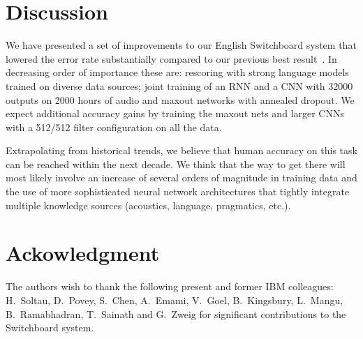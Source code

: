 \documentclass[a4paper]{article}
\begin{document}
\section{Discussion}
\label{conclusion} 
We have presented a set of improvements to our English Switchboard
system that lowered the error rate substantially compared to our
previous best result~\cite{soltau14}. In decreasing order of
importance these are: rescoring with strong language models trained on
diverse data sources; joint training of an RNN and a CNN with 32000 outputs on
2000 hours of audio and maxout networks with annealed dropout. We
expect additional accuracy gains by training the maxout nets and
larger CNNs with a 512/512 filter configuration on all the data.

Extrapolating from historical trends, we believe that human accuracy
on this task can be reached within the next decade. We think that the way to
get there will most likely involve an increase of several orders of
magnitude in training data and the use of more sophisticated neural
network architectures that tightly integrate multiple knowledge
sources (acoustics, language, pragmatics, etc.).

\section{Ackowledgment} 
The authors wish to thank the following present and former IBM colleagues:
H.~Soltau, D.~Povey, S.~Chen, A.~Emami, V.~Goel, B.~Kingsbury,
L.~Mangu, B.~Ramabhadran, T.~Sainath and G.~Zweig for significant
contributions to the Switchboard system.



\end{document}

